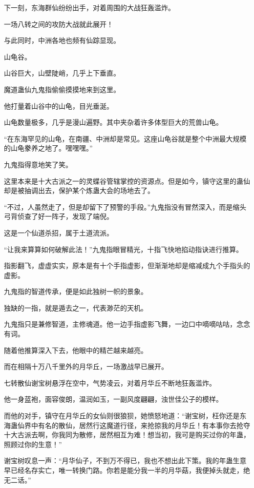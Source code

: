 \begin{this_body}
下一刻，东海群仙纷纷出手，对着周围的大战狂轰滥炸。

一场八转之间的攻防大战就此展开！

与此同时，中洲各地也频有仙踪显现。

山龟谷。

山谷巨大，山壁陡峭，几乎上下垂直。

魔道蛊仙九鬼指偷偷摸摸地来到这里。

他打量着山谷中的山龟，目光垂涎。

山龟数量极多，几乎是漫山遍野。其中夹杂着许多体型巨大的荒兽山龟。

“在东海罕见的山龟，在南疆、中洲却是常见。这座山龟谷就是整个中洲最大规模的山龟豢养之地了。嘿嘿嘿。”

九鬼指得意地笑了笑。

这里本来是十大古派之一的灵蝶谷管辖掌控的资源点。但是如今，镇守这里的蛊仙却是被抽调出去，保护某个炼蛊大会的场地去了。

“不过，人虽然走了，但是却留下了预警的手段。”九鬼指没有冒然深入，而是缩头弓背侦查了好一阵子，发现了端倪。

这是一个仙道杀招，属于土道流派。

“让我来算算如何破解此法！”九鬼指眼冒精光，十指飞快地掐动指诀进行推算。

指影翻飞，虚虚实实，原本是有十个手指虚影，但渐渐地却是缩减成九个手指头的虚影。

九鬼指的智道传承，便是如此独树一帜的景象。

独缺的一指，就是遁去之一，代表渺茫的天机。

九鬼指只是兼修智道，主修魂道。他一边手指虚影飞舞，一边口中嘀嘀咕咕，念念有词。

随着他推算深入下去，他眼中的精芒越来越亮。

而在相隔十万八千里外的月华丘，一场激战早已展开。

七转散仙谢宝树悬浮在空中，气势凌云，对着月华丘不断地狂轰滥炸。

他一身蓝袍，面容俊朗，温润如玉，一副风度翩翩，浊世佳公子的模样。

而他的对手，镇守在月华丘的女仙则很狼狈，她愤怒地道：“谢宝树，枉你还是东海蛊仙界中有名的散仙，居然行这魔道行径，来抢掠我的月华丘！有本事你去抢夺十大古派去啊，你我同为散修，居然相互为难！想当初，我可是购买过你的年蛊，照顾过你的生意！”

谢宝树叹息一声：“月华仙子，不到万不得已，我也不想出此下策。我的年蛊生意早已经名存实亡，唯一转换门路。你若是能分我一半的月华菇，我便掉头就走，绝无二话。”


\end{this_body}
